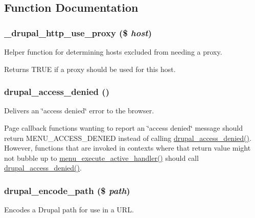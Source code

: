 \subsection{Function Documentation}
\hypertarget{group__http__handling_gadfd5b8902a9838e814df472cdd930106}{
\subsubsection[{\_\-drupal\_\-http\_\-use\_\-proxy}]{\setlength{\rightskip}{0pt plus 5cm}\_\-drupal\_\-http\_\-use\_\-proxy (\$ {\em host})}}
\label{group__http__handling_gadfd5b8902a9838e814df472cdd930106}
Helper function for determining hosts excluded from needing a proxy.

\begin{DoxyReturn}{Returns}
TRUE if a proxy should be used for this host. 
\end{DoxyReturn}
\hypertarget{group__http__handling_ga0bbff371f9373002e71f2e1347fcf481}{
\subsubsection[{drupal\_\-access\_\-denied}]{\setlength{\rightskip}{0pt plus 5cm}drupal\_\-access\_\-denied ()}}
\label{group__http__handling_ga0bbff371f9373002e71f2e1347fcf481}
Delivers an \char`\"{}access denied\char`\"{} error to the browser.

Page callback functions wanting to report an \char`\"{}access denied\char`\"{} message should return MENU\_\-ACCESS\_\-DENIED instead of calling \hyperlink{group__http__handling_ga0bbff371f9373002e71f2e1347fcf481}{drupal\_\-access\_\-denied()}. However, functions that are invoked in contexts where that return value might not bubble up to \hyperlink{group__menu_gae33bae24fcac6126aa272d1c437f947c}{menu\_\-execute\_\-active\_\-handler()} should call \hyperlink{group__http__handling_ga0bbff371f9373002e71f2e1347fcf481}{drupal\_\-access\_\-denied()}. \hypertarget{group__http__handling_gab333a51385bd4e339c464943553a6670}{
\subsubsection[{drupal\_\-encode\_\-path}]{\setlength{\rightskip}{0pt plus 5cm}drupal\_\-encode\_\-path (\$ {\em path})}}
\label{group__http__handling_gab333a51385bd4e339c464943553a6670}
Encodes a Drupal path for use in a URL.

